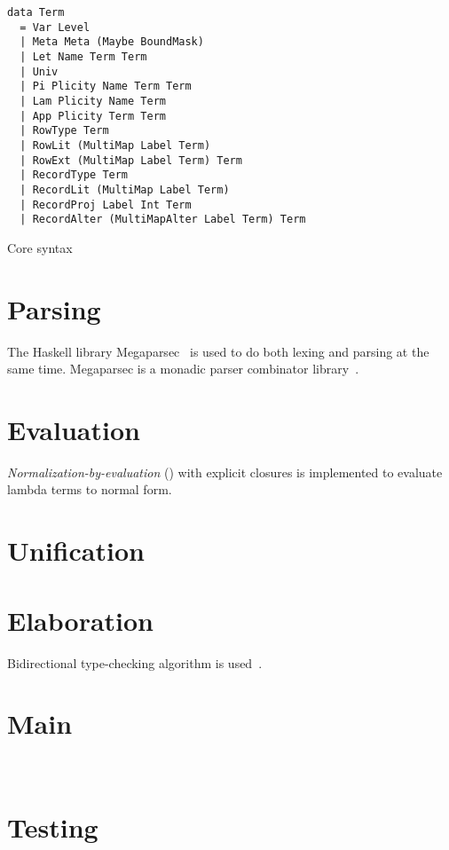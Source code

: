 \begin{listing}
  \begin{verbatim}
data Term
  = Var Level
  | Meta Meta (Maybe BoundMask)
  | Let Name Term Term
  | Univ
  | Pi Plicity Name Term Term
  | Lam Plicity Name Term
  | App Plicity Term Term
  | RowType Term
  | RowLit (MultiMap Label Term)
  | RowExt (MultiMap Label Term) Term
  | RecordType Term
  | RecordLit (MultiMap Label Term)
  | RecordProj Label Int Term
  | RecordAlter (MultiMapAlter Label Term) Term
  \end{verbatim}
  \caption{Core syntax }\label{lst:core-adt}
\end{listing}

\section{Parsing}

The Haskell library Megaparsec~\cite{megaparsec} is used to do both lexing and
parsing at the same time. Megaparsec is a monadic parser combinator
library~\cite{parsing}.

\section{Evaluation}

\emph{Normalization-by-evaluation} () with explicit closures is
implemented to evaluate lambda terms to normal form.

\section{Unification}

\section{Elaboration}

Bidirectional type-checking algorithm is used~\cite{deptypecheck, lambdapi}.

\section{Main}

~\cite{optparse}

\section{Testing}
